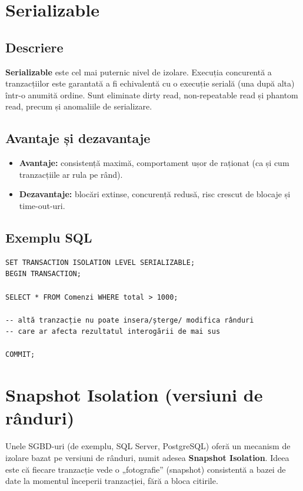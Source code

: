 \documentclass[11pt,a4paper]{article}
\begin{document}
\section{Serializable}

\subsection{Descriere}

\textbf{Serializable} este cel mai puternic nivel de izolare. Execuția concurentă a tranzacțiilor este garantată a fi echivalentă cu o execuție serială (una după alta) într-o anumită ordine. Sunt eliminate dirty read, non-repeatable read și phantom read, precum și anomaliile de serializare.

\subsection{Avantaje și dezavantaje}

\begin{itemize}[leftmargin=1.5cm]
  \item \textbf{Avantaje:} consistență maximă, comportament ușor de raționat (ca și cum tranzacțiile ar rula pe rând).
  \item \textbf{Dezavantaje:} blocări extinse, concurență redusă, risc crescut de blocaje și time-out-uri.
\end{itemize}

\subsection{Exemplu SQL}

\begin{verbatim}
SET TRANSACTION ISOLATION LEVEL SERIALIZABLE;
BEGIN TRANSACTION;

SELECT * FROM Comenzi WHERE total > 1000;

-- altă tranzacție nu poate insera/șterge/ modifica rânduri
-- care ar afecta rezultatul interogării de mai sus

COMMIT;
\end{verbatim}

\section{Snapshot Isolation (versiuni de rânduri)}

Unele SGBD-uri (de exemplu, SQL Server, PostgreSQL) oferă un mecanism de izolare bazat pe versiuni de rânduri, numit adesea \textbf{Snapshot Isolation}. Ideea este că fiecare tranzacție vede o „fotografie” (snapshot) consistentă a bazei de date la momentul începerii tranzacției, fără a bloca citirile.
\end{document}
